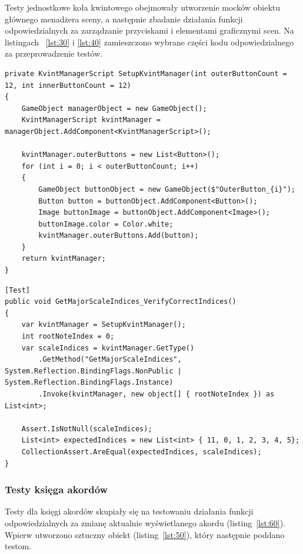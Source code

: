 Testy jednostkowe koła kwintowego obejmowały utworzenie mocków obiektu głównego menadżera sceny, a następnie zbadanie działania funkcji odpowiedzialnych za zarządzanie przyciskami i elementami graficznymi scen. Na listingach ~\ref{lst:30} i \ref{lst:40} zamieszczono wybrane części kodu odpowiedzialnego za przeprowadzenie testów.

\begin{lstlisting}[style=sharpcstyle,caption=Funkcja \texttt{SetupKvintManager}, label=lst:30]
private KvintManagerScript SetupKvintManager(int outerButtonCount = 12, int innerButtonCount = 12)
{
    GameObject managerObject = new GameObject();
    KvintManagerScript kvintManager = managerObject.AddComponent<KvintManagerScript>();
    
    kvintManager.outerButtons = new List<Button>();
    for (int i = 0; i < outerButtonCount; i++)
    {
        GameObject buttonObject = new GameObject($"OuterButton_{i}");
        Button button = buttonObject.AddComponent<Button>();
        Image buttonImage = buttonObject.AddComponent<Image>();
        buttonImage.color = Color.white;
        kvintManager.outerButtons.Add(button);
    }
    return kvintManager;
}  
\end{lstlisting}

\begin{lstlisting}[style=sharpcstyle,caption=Funkcja \texttt{GetMajorScaleIndices\_VerifyCorrectIndices}, label=lst:40]
[Test]
public void GetMajorScaleIndices_VerifyCorrectIndices()
{
    var kvintManager = SetupKvintManager();
    int rootNoteIndex = 0;
    var scaleIndices = kvintManager.GetType()
        .GetMethod("GetMajorScaleIndices", System.Reflection.BindingFlags.NonPublic | System.Reflection.BindingFlags.Instance)
        .Invoke(kvintManager, new object[] { rootNoteIndex }) as List<int>;

    Assert.IsNotNull(scaleIndices);    
    List<int> expectedIndices = new List<int> { 11, 0, 1, 2, 3, 4, 5};
    CollectionAssert.AreEqual(expectedIndices, scaleIndices);
}
\end{lstlisting}

\subsubsection{Testy księga akordów}

Testy dla księgi akordów skupiały się na testowaniu działania funkcji odpowiedzialnych za zmianę aktualnie wyświetlanego akordu (listing~\ref{lst:60}). Wpierw utworzono sztuczny obiekt (listing~\ref{lst:50}), który następnie poddano testom.

